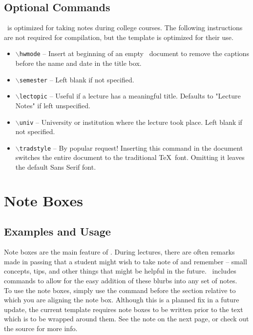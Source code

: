 \documentclass{ClassTeX}
\begin{document}
	\subsection{Optional Commands}
	\ClassTeX\ is optimized for taking notes during college courses.  The following instructions are not required for compilation, but the template is optimized for their use.
	\begin{itemize}
		\item \texttt{$\backslash$hwmode} -- Insert at beginning of an empty \ClassTeX\ document to remove the captions before the name and date in the title box.
		\item \texttt{$\backslash$semester} -- Left blank if not specified.
		\item \texttt{$\backslash$lectopic} -- Useful if a lecture has a meaningful title.  Defaults to "Lecture Notes" if left unspecified.
		\item \texttt{$\backslash$univ} -- University or institution where the lecture took place.  Left blank if not specified.
		\item \texttt{$\backslash$tradstyle} -- By popular request!  Inserting this command in the document switches the entire document to the traditional \TeX\ font.  Omitting it leaves the default Sans Serif font.
	\end{itemize}

	\section{Note Boxes}
	
	\subsection{Examples and Usage}
		
	Note boxes are the main feature of \ClassTeX.  During lectures, there are often remarks made in passing that a student might wish to take note of and remember -- small concepts, tips, and other things that might be helpful in the future.  \ClassTeX\ includes commands to allow for the easy addition of these blurbs into any set of notes.\\

	To use the note boxes, simply use the command before the section relative to which you are aligning the note box.  Although this is a planned fix in a future update, the current template requires note boxes to be written prior to the text which is to be wrapped around them.  See the note on the next page, or check out the source for more info.\\
	
\end{document}
